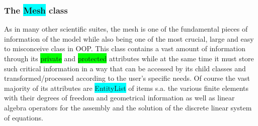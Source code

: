 \documentclass[11pt]{article}
\begin{document}
\subsubsection{The \colorbox{cyan}{Mesh} class}
As in many other scientific suites, the mesh is one of the fundamental pieces of information of the model while also being one of the most crucial, large and easy to misconceive class in OOP. This class contains a vast amount of information through its \colorbox{lime}{private} and \colorbox{lime}{protected} attributes while at the same time it must store such critical information in a way that can be accessed by its child classes and transformed/processed according to the user's specific needs. Of course the vast majority of its attributes are \colorbox{cyan}{EntityList} of items s.a. the various finite elements with their degrees of freedom and geometrical information as well as linear algebra operators for the assembly and the solution of the discrete linear system of equations.

\newpage
\end{document}
